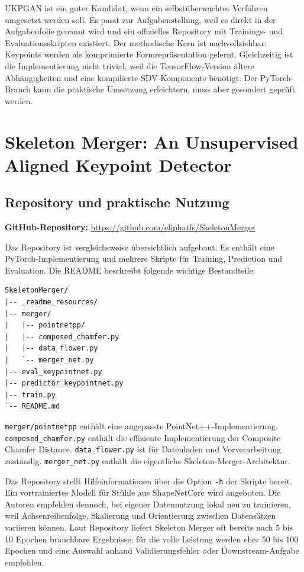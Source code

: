 \documentclass[11pt,a4paper]{article}
\begin{document}
UKPGAN ist ein guter Kandidat, wenn ein selbstüberwachtes Verfahren umgesetzt werden soll. Es passt zur Aufgabenstellung, weil es direkt in der Aufgabenfolie genannt wird und ein offizielles Repository mit Trainings- und Evaluationsskripten existiert. Der methodische Kern ist nachvollziehbar: Keypoints werden als komprimierte Formrepräsentation gelernt. Gleichzeitig ist die Implementierung nicht trivial, weil die TensorFlow-Version ältere Abhängigkeiten und eine kompilierte SDV-Komponente benötigt. Der PyTorch-Branch kann die praktische Umsetzung erleichtern, muss aber gesondert geprüft werden.

\section{Skeleton Merger: An Unsupervised Aligned Keypoint Detector}

\subsection{Repository und praktische Nutzung}

\textbf{GitHub-Repository:} \url{https://github.com/eliphatfs/SkeletonMerger}

Das Repository ist vergleichsweise übersichtlich aufgebaut. Es enthält eine PyTorch-Implementierung und mehrere Skripte für Training, Prediction und Evaluation. Die README beschreibt folgende wichtige Bestandteile:

\begin{lstlisting}
SkeletonMerger/
|-- _readme_resources/
|-- merger/
|   |-- pointnetpp/
|   |-- composed_chamfer.py
|   |-- data_flower.py
|   `-- merger_net.py
|-- eval_keypointnet.py
|-- predictor_keypointnet.py
|-- train.py
`-- README.md
\end{lstlisting}

\texttt{merger/pointnetpp} enthält eine angepasste PointNet++-Implementierung. \texttt{composed\_chamfer.py} enthält die effiziente Implementierung der Composite Chamfer Distance. \texttt{data\_flower.py} ist für Datenladen und Vorverarbeitung zuständig. \texttt{merger\_net.py} enthält die eigentliche Skeleton-Merger-Architektur.

Das Repository stellt Hilfeinformationen über die Option \texttt{-h} der Skripte bereit. Ein vortrainiertes Modell für Stühle aus ShapeNetCore wird angeboten. Die Autoren empfehlen dennoch, bei eigener Datennutzung lokal neu zu trainieren, weil Achsenreihenfolge, Skalierung und Orientierung zwischen Datensätzen variieren können. Laut Repository liefert Skeleton Merger oft bereits nach 5 bis 10 Epochen brauchbare Ergebnisse; für die volle Leistung werden eher 50 bis 100 Epochen und eine Auswahl anhand Validierungsfehler oder Downstream-Aufgabe empfohlen.
\end{document}
